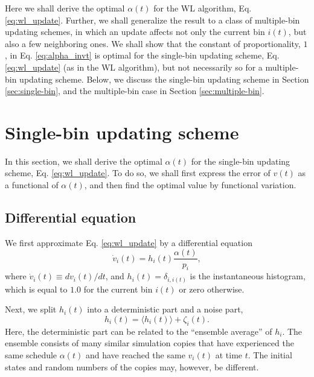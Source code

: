 \documentclass[reprint]{revtex4-1}
\begin{document}
Here we shall derive the optimal $\alpha(t)$
for the WL algorithm, Eq. \eqref{eq:wl_update}.
%
Further, we shall generalize the result
to a class of multiple-bin updating schemes,
in which an update affects
not only the current bin $i(t)$,
but also a few neighboring ones.
%
We shall show that
the constant of proportionality, $1$,
in Eq. \eqref{eq:alpha_invt}
is optimal for the single-bin updating scheme,
Eq. \eqref{eq:wl_update}
(as in the WL algorithm),
but not necessarily so
for a multiple-bin updating scheme.
%
Below, we discuss the single-bin updating scheme
in Section \ref{sec:single-bin},
and the multiple-bin case
in Section \ref{sec:multiple-bin}.



\section{\label{sec:single-bin}
Single-bin updating scheme}



In this section,
we shall derive the optimal $\alpha(t)$
for the single-bin updating scheme,
Eq. \eqref{eq:wl_update}.
%
To do so,
we shall first express the error of $v(t)$
as a functional of $\alpha(t)$,
and then find the optimal value
by functional variation.



\subsection{Differential equation}



We first approximate Eq. \eqref{eq:wl_update}
by a differential equation
%
\begin{equation}
  \dot v_i(t)
  =
  h_i(t) \frac{ \alpha(t) } { p_i },
  \label{eq:vt_diffeq}
\end{equation}
%
where
$\dot v_i(t) \equiv dv_i(t)/dt$,
%
and $h_i(t) = \delta_{i, i(t)}$
is the instantaneous histogram,
which is equal to $1.0$
for the current bin $i(t)$
or zero otherwise.



Next, we split $h_i(t)$ into a deterministic part
and a noise part,
%
\begin{equation}
  h_i(t) = \langle h_i(t) \rangle + \zeta_i(t).
  \label{eq:h_split}
\end{equation}
%
Here, the deterministic part can be related
to the ``ensemble average'' of $h_i$.
%
The ensemble consists of many similar simulation copies
that have experienced the same schedule $\alpha(t)$
and have reached the same $v_i(t)$
at time $t$.
%
The initial states and random numbers of the copies
may, however, be different.
\end{document}

